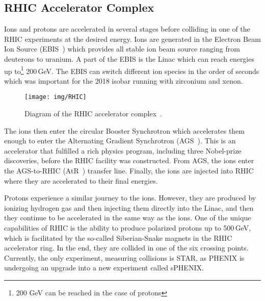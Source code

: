  

\subsection{RHIC Accelerator Complex}
Ions and protons are accelerated in several stages before colliding in one of the RHIC experiments at the desired energy. Ions are generated in the Electron Beam Ion Source (EBIS~\cite{EBIS}) which provides all stable ion beam source ranging from deuterons to uranium. A part of the EBIS is the Linac which can reach energies up to\footnote{200 GeV can be reached in the case of protons} 200$\,$GeV\@. The EBIS can switch different ion species in the order of seconds which was important for the 2018 isobar running with zirconium and xenon.

\begin{figure}[htb]
\begin{center}
 \texttt{[image: img/RHIC]}\\
\end{center}
\caption[Diagram of the RHIC accelerator complex.]{\label{RHICcomplex}Diagram of the RHIC accelerator complex~\cite{RHICpages}.}
\end{figure}

The ions then enter the circular Booster Synchrotron which accelerates them enough to enter the Alternating Gradient Synchrotron (AGS~\cite{AGS}). This is an accelerator that fulfilled a rich physics program, including three Nobel-prize discoveries, before the RHIC facility was constructed. From AGS, the ions enter the AGS-to-RHIC (AtR~\cite{AtR}) transfer line. Finally, the ions are injected into RHIC where they are accelerated to their final energies. 

Protons experience a similar journey to the ions. However, they are produced by ionizing hydrogen gas and then injecting them directly into the Linac, and then they continue to be accelerated in the same way as the ions. One of the unique capabilities of RHIC is the ability to produce polarized protons up to 500$\,$GeV, which is facilitated by the so-called Siberian-Snake magnets in the RHIC accelerator ring. In the end, they are collided in one of the six crossing points. Currently, the only experiment, measuring collisions is STAR, as PHENIX is undergoing an upgrade into a new experiment called sPHENIX\@.





